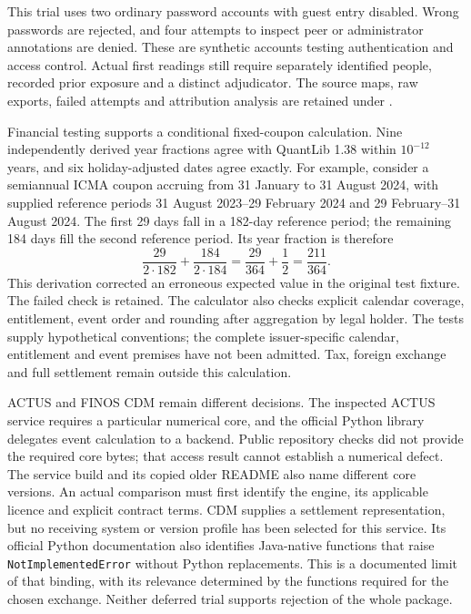 This trial uses two ordinary password accounts with guest entry disabled.
Wrong passwords are rejected, and four attempts to inspect peer or administrator
annotations are denied. These are synthetic accounts testing authentication and
access control. Actual first readings still require separately identified people,
recorded prior exposure and a distinct adjudicator. The source maps, raw exports,
failed attempts and attribution analysis are retained under
.

\begingroup
{}
Financial testing supports a conditional fixed-coupon calculation. Nine
independently derived year fractions agree with QuantLib 1.38 within
$10^{-12}$ years, and six holiday-adjusted dates agree exactly. For example,
consider a semiannual ICMA coupon accruing from 31 January to 31 August 2024,
with supplied reference periods 31 August 2023--29 February 2024 and
29 February--31 August 2024. The first 29 days fall in a 182-day reference
period; the remaining 184 days fill the second reference period. Its year
fraction is therefore
\[
 \frac{29}{2\cdot182}+\frac{184}{2\cdot184}
 =\frac{29}{364}+\frac12=\frac{211}{364}.
\]
This derivation corrected an erroneous expected value in the original test
fixture. The failed check is retained. The calculator also checks explicit
calendar coverage, entitlement, event order and rounding after aggregation by
legal holder. The tests supply hypothetical conventions; the complete
issuer-specific calendar, entitlement and event premises have not been admitted.
Tax, foreign exchange and full settlement remain outside this calculation.
\par\endgroup

ACTUS and FINOS CDM remain different decisions. The inspected ACTUS service
requires a particular numerical core, and the official Python library delegates
event calculation to a backend. Public repository checks did not provide the
required core bytes; that access result cannot establish a numerical defect.
The service build and its copied older README also name different core versions.
An actual comparison must first identify the engine, its applicable licence and
explicit contract terms. CDM supplies a settlement representation, but no receiving
system or version profile has been selected for this service. Its official Python
documentation also identifies Java-native functions that raise
\texttt{NotImplementedError} without Python replacements. This is a documented
limit of that binding, with its relevance determined by the functions required
for the chosen exchange. Neither deferred trial supports rejection of the whole
package.

